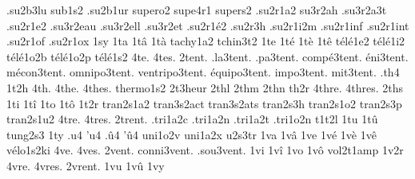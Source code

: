 {                    .su2b3lu
                    sub1s2
                    .su2b1ur
                    supero2
                    supe4r1
                    supers2
                    .su2r1a2
                    su3r2ah
                    .su3r2a3t
                    .su2r1e2
                    .su3r2eau
                    .su3r2ell
                    .su3r2et
                    .su2r1é2
                    .su2r3h
                    .su2r1i2m
                    .su2r1inf
                    .su2r1int
                    .su2r1of
                    .su2r1ox
1sy
1ta
1tâ
1tà
                    tachy1a2
                    tchin3t2
1te
1té
1tè
1tê
                    télé1e2
                    télé1i2
                    télé1o2b
                    télé1o2p
                    télé1s2
4te.
4tes.
        2tent. %
     .la3tent.
     .pa3tent.
   compé3tent.
     éni3tent.
   mécon3tent.
  omnipo3tent.
ventripo3tent.
  équipo3tent.
    impo3tent.
     mit3tent.
%
.th4
1t2h
4th.
4the.
4thes.
                    thermo1s2
                    2t3heur
2thl %
2thm
2thn
th2r
4thre.
4thres.
2ths
1ti
1tî
1to
1tô
1t2r
                    tran2s1a2
                    tran3s2act
                    tran3s2ats
                    tran2s3h
                    tran2s1o2
                    tran2s3p
                    tran2s1u2
4tre.
4tres.
2trent. %
                    .tri1a2c
                    .tri1a2n
                    .tri1a2t
                    .tri1o2n
                    t1t2l
1tu
1tû
tung2s3
1ty
.u4
'u4
.û4
'û4
                    uni1o2v
                    uni1a2x
                    u2s3tr
1va
1vâ
1ve
1vé
1vè
1vê
                    vélo1s2ki
4ve.
4ves.
     2vent.
conni3vent.
 .sou3vent.
%
1vi
1vî
1vo
1vô
                    vol2t1amp
1v2r
4vre.
4vres.
2vrent. %
1vu
1vû
1vy
}
